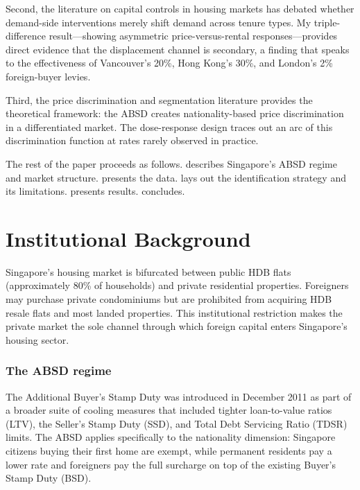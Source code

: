 \documentclass[12pt]{article}
\begin{document}
Second, the literature on capital controls in housing markets \citep{Favilukis2017, Badarinza2019, SaDaSilva2020} has debated whether demand-side interventions merely shift demand across tenure types. My triple-difference result---showing asymmetric price-versus-rental responses---provides direct evidence that the displacement channel is secondary, a finding that speaks to the effectiveness of Vancouver's 20\%, Hong Kong's 30\%, and London's 2\% foreign-buyer levies.

Third, the price discrimination and segmentation literature \citep{Salop1979, Holmes2014} provides the theoretical framework: the ABSD creates nationality-based price discrimination in a differentiated market. The dose-response design traces out an arc of this discrimination function at rates rarely observed in practice.

The rest of the paper proceeds as follows.  describes Singapore's ABSD regime and market structure.  presents the data.  lays out the identification strategy and its limitations.  presents results.  concludes.

\section{Institutional Background}\label{sec:background}

Singapore's housing market is bifurcated between public HDB flats (approximately 80\% of households) and private residential properties. Foreigners may purchase private condominiums but are prohibited from acquiring HDB resale flats and most landed properties. This institutional restriction makes the private market the sole channel through which foreign capital enters Singapore's housing sector.

\subsubsection*{The ABSD regime} The Additional Buyer's Stamp Duty was introduced in December 2011 as part of a broader suite of cooling measures that included tighter loan-to-value ratios (LTV), the Seller's Stamp Duty (SSD), and Total Debt Servicing Ratio (TDSR) limits. The ABSD applies specifically to the nationality dimension: Singapore citizens buying their first home are exempt, while permanent residents pay a lower rate and foreigners pay the full surcharge on top of the existing Buyer's Stamp Duty (BSD).
\end{document}
